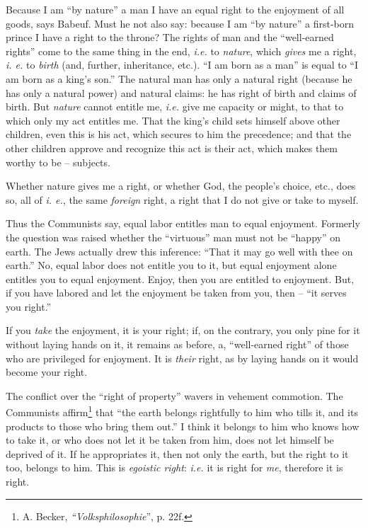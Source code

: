 \documentclass[12pt,a4paper]{book}
\begin{document}
Because I am ``by nature'' a man I have an equal right to the enjoyment of 
all goods, says Babeuf. Must he not also say: because I am ``by nature'' a 
first-born prince I have a right to the throne? The rights of man and the 
``well-earned rights'' come to the same thing in the end, \textit{i.e.} to 
\textit{nature}, which \textit{gives} me a right, \textit{i. e.} to 
\textit{birth} (and, further, inheritance, etc.). ``I am born as a man'' is 
equal to ``I am born as a king's son.'' The natural man has only a natural 
right (because he has only a natural power) and natural claims: he has right 
of birth and claims of birth. But \textit{nature} cannot entitle me, 
\textit{i.e.} give me capacity or might, to that to which only my act entitles 
me. That the king's child sets himself above other children, even this is his 
act, which secures to him the precedence; and that the other children approve 
and recognize this act is their act, which makes them worthy to be -- 
subjects.

Whether nature gives me a right, or whether God, the people's choice, etc., 
does so, all of \textit{i. e.}, the same \textit{foreign} right, a right that 
I do not give or take to myself.

Thus the Communists say, equal labor entitles man to equal enjoyment. Formerly 
the question was raised whether the ``virtuous'' man must not be ``happy'' 
on earth. The Jews actually drew this inference: ``That it may go well with 
thee on earth.'' No, equal labor does not entitle you to it, but equal 
enjoyment alone entitles you to equal enjoyment. Enjoy, then you are entitled 
to enjoyment. But, if you have labored and let the enjoyment be taken from 
you, then -- ``it serves you right.''

If you \textit{take} the enjoyment, it is your right; if, on the contrary, you 
only pine for it without laying hands on it, it remains as before, a, 
``well-earned right'' of those who are privileged for enjoyment. It is 
\textit{their} right, as by laying hands on it would become your right.

The conflict over the ``right of property'' wavers in vehement commotion. 
The Communists affirm\footnote{A. Becker, \textit{``Volksphilosophie}'', p. 
22f.} that ``the earth belongs rightfully to him who tills it, and its 
products to those who bring them out.'' I think it belongs to him who knows 
how to take it, or who does not let it be taken from him, does not let himself 
be deprived of it. If he appropriates it, then not only the earth, but the 
right to it too, belongs to him. This is \textit{egoistic right}: 
\textit{i.e.} it is right for \textit{me}, therefore it is right.
\end{document}
